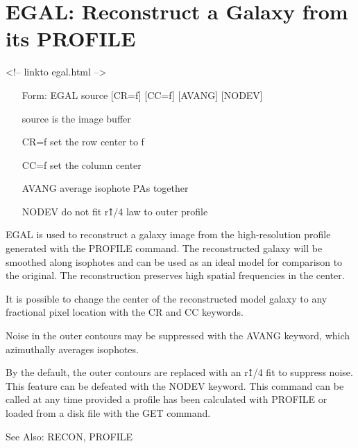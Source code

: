 \section{EGAL: Reconstruct a Galaxy from its PROFILE}
\begin{rawhtml}
<!-- linkto egal.html -->
\end{rawhtml}
\begin{itemize}
  \item[Form: EGAL source {[CR=f]} {[CC=f]} {[AVANG]} {[NODEV]}\hfill]{}
  \item[source]{is the image buffer}
  \item[CR=f]{set the row center to f}
  \item[CC=f]{set the column center}
  \item[AVANG]{average isophote PAs together}
  \item[NODEV]{do not fit r\^1/4 law to outer profile}
\end{itemize}

EGAL is used to reconstruct a galaxy image from the high-resolution profile
generated with the PROFILE command.  The reconstructed galaxy will be
smoothed along isophotes and can be used as an ideal model for comparison
to the original.  The reconstruction preserves high spatial frequencies in
the center.  

It is possible to change the center of the reconstructed model galaxy to
any fractional pixel location with the CR and CC keywords.  

Noise in the outer contours may be suppressed with the AVANG keyword, which
azimuthally averages isophotes.  

By the default, the outer contours are replaced with an r\^1/4 fit to
suppress noise.  This feature can be defeated with the NODEV keyword.  This
command can be called at any time provided a profile has been calculated
with PROFILE or loaded from a disk file with the GET command.

See Also: RECON, PROFILE


